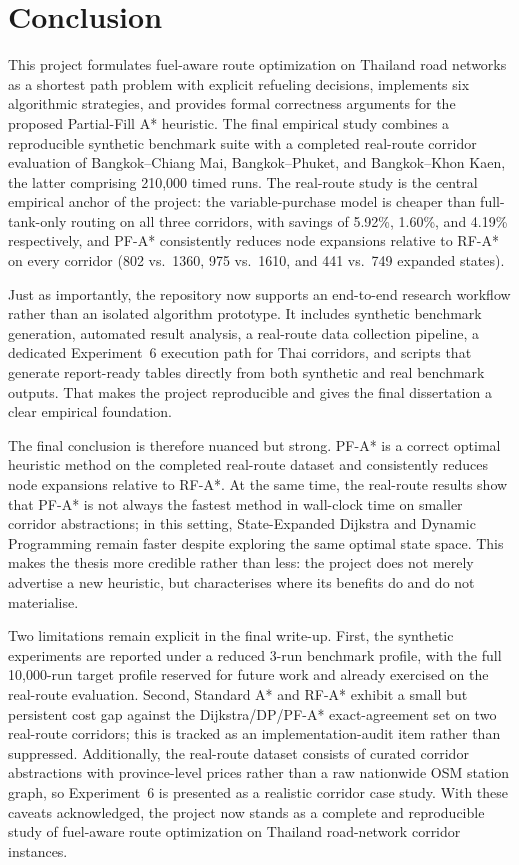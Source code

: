 \chapter{Conclusion}
\label{ch:conclusion}

This project formulates fuel-aware route optimization on Thailand road networks as a shortest
path problem with explicit refueling decisions, implements six algorithmic strategies, and
provides formal correctness arguments for the proposed Partial-Fill A* heuristic.
The final empirical study combines a reproducible synthetic benchmark suite with a completed
real-route corridor evaluation of Bangkok--Chiang Mai, Bangkok--Phuket, and
Bangkok--Khon Kaen, the latter comprising 210{,}000 timed runs.
The real-route study is the central empirical anchor of the project: the variable-purchase
model is cheaper than full-tank-only routing on all three corridors, with savings of
5.92\%, 1.60\%, and 4.19\% respectively, and PF-A* consistently reduces node expansions
relative to RF-A* on every corridor (802 vs.\ 1360, 975 vs.\ 1610, and 441 vs.\ 749
expanded states).

Just as importantly, the repository now supports an end-to-end research workflow rather than
an isolated algorithm prototype.
It includes synthetic benchmark generation, automated result analysis, a real-route data
collection pipeline, a dedicated Experiment~6 execution path for Thai corridors, and scripts
that generate report-ready tables directly from both synthetic and real benchmark outputs.
That makes the project reproducible and gives the final dissertation a clear empirical
foundation.

The final conclusion is therefore nuanced but strong.
PF-A* is a correct optimal heuristic method on the completed real-route dataset and
consistently reduces node expansions relative to RF-A*.
At the same time, the real-route results show that PF-A* is not always the fastest method in
wall-clock time on smaller corridor abstractions; in this setting, State-Expanded Dijkstra and
Dynamic Programming remain faster despite exploring the same optimal state space.
This makes the thesis more credible rather than less: the project does not merely advertise a
new heuristic, but characterises where its benefits do and do not materialise.

Two limitations remain explicit in the final write-up.
First, the synthetic experiments are reported under a reduced 3-run benchmark profile, with
the full 10{,}000-run target profile reserved for future work and already exercised on
the real-route evaluation.
Second, Standard A* and RF-A* exhibit a small but persistent cost gap against the
Dijkstra/DP/PF-A* exact-agreement set on two real-route corridors; this is tracked as an
implementation-audit item rather than suppressed.
Additionally, the real-route dataset consists of curated corridor abstractions with
province-level prices rather than a raw nationwide OSM station graph, so Experiment~6 is
presented as a realistic corridor case study.
With these caveats acknowledged, the project now stands as a complete and reproducible study
of fuel-aware route optimization on Thailand road-network corridor instances.

